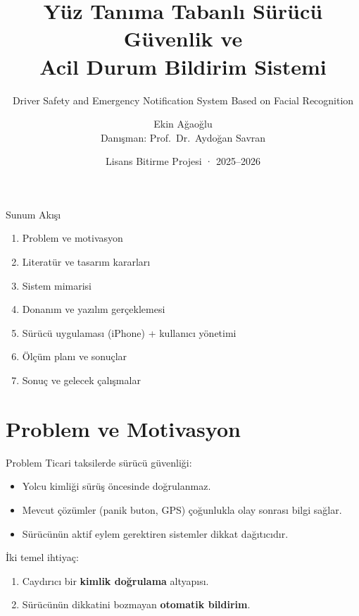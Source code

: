 \documentclass[aspectratio=169,12pt]{beamer}
\title[Sürücü Güvenliği]{Yüz Tanıma Tabanlı Sürücü Güvenlik ve\\Acil Durum Bildirim Sistemi}
\subtitle{Driver Safety and Emergency Notification System Based on Facial Recognition}
\author[E.\ Ağaoğlu]{Ekin Ağaoğlu \\ \small Danışman: Prof.\ Dr.\ Aydoğan Savran}
\institute[Ege Ü.]{Ege Üniversitesi \\ Elektrik-Elektronik Mühendisliği Bölümü}
\date{Lisans Bitirme Projesi · 2025--2026}
\begin{document}
\begin{frame}[plain]
    \titlepage
\end{frame}

\begin{frame}{Sunum Akışı}
    \begin{enumerate}[<+->]
        \item Problem ve motivasyon
        \item Literatür ve tasarım kararları
        \item Sistem mimarisi
        \item Donanım ve yazılım gerçeklemesi
        \item Sürücü uygulaması (iPhone) + kullanıcı yönetimi
        \item Ölçüm planı ve sonuçlar
        \item Sonuç ve gelecek çalışmalar
    \end{enumerate}
\end{frame}

\section{Problem ve Motivasyon}

\begin{frame}{Problem}
    Ticari taksilerde sürücü güvenliği:
    \begin{itemize}
        \item Yolcu kimliği sürüş öncesinde \alert{doğrulanmaz}.
        \item Mevcut çözümler (panik buton, GPS) çoğunlukla
              \alert{olay sonrası} bilgi sağlar.
        \item Sürücünün aktif eylem gerektiren sistemler dikkat dağıtıcıdır.
    \end{itemize}

    \vspace{0.4cm}
    İki temel ihtiyaç:
    \begin{enumerate}
        \item Caydırıcı bir \textbf{kimlik doğrulama} altyapısı.
        \item Sürücünün dikkatini bozmayan \textbf{otomatik bildirim}.
    \end{enumerate}
\end{frame}
\end{document}
